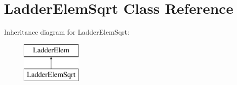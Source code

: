 \hypertarget{class_ladder_elem_sqrt}{\section{Ladder\-Elem\-Sqrt Class Reference}
\label{class_ladder_elem_sqrt}
}
Inheritance diagram for Ladder\-Elem\-Sqrt\-:\begin{figure}[H]
\begin{center}
\leavevmode
\includegraphics[height=2.000000cm]{class_ladder_elem_sqrt}
\end{center}
\end{figure}
